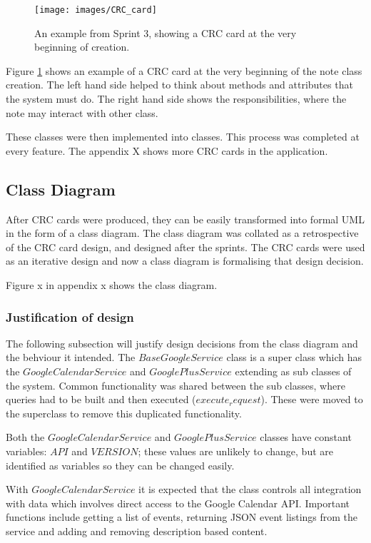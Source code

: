 \begin{figure}[h]
  \centering
  \texttt{[image: images/CRC\_card]}
  \caption{An example from Sprint 3, showing a CRC card at the very beginning of creation.}
  \label{fig:crc1}
\end{figure}

Figure \ref{fig:crc1} shows an example of a CRC card at the very beginning of the note class creation. The left hand side helped to think about methods and attributes that the system must do. The right hand side shows the responsibilities, where the note may interact with other class.

These classes were then implemented into classes. This process was completed at every feature. The appendix X shows more CRC cards in the application.
\subsection{Class Diagram}
After CRC cards were produced, they can be easily transformed into formal UML in the form of a class diagram. The class diagram was collated as a retrospective of the CRC card design, and designed after the sprints. The CRC cards were used as an iterative design and now a class diagram is formalising that design decision.

Figure x in appendix x shows the class diagram.

\subsubsection{Justification of design}
The following subsection will justify design decisions from the class diagram and the behviour it intended.
The $BaseGoogleService$ class is a super class which has the $GoogleCalendarService$ and $GooglePlusService$ extending as sub classes of the system. Common functionality was shared between the sub classes, where queries had to be built and then executed ($execute_request$). These were moved to the superclass to remove this duplicated functionality.

Both the $GoogleCalendarService$ and $GooglePlusService$ classes have constant variables: $API$ and $VERSION$; these values are unlikely to change, but are identified as variables so they can be changed easily.

With $GoogleCalendarService$ it is expected that the class controls all integration with data which involves direct access to the Google Calendar API. Important functions include getting a list of events, returning JSON event listings from the service and adding and removing description based content.

